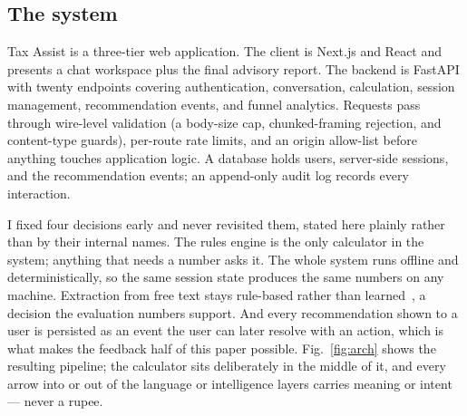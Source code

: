 \documentclass[conference]{IEEEtran}
\begin{document}
\subsection{The system}
Tax Assist is a three-tier web application. The client is Next.js and
React and presents a chat workspace plus the final advisory report.
The backend is FastAPI with twenty endpoints covering
authentication, conversation, calculation, session management,
recommendation events, and funnel analytics. Requests pass through
wire-level validation (a body-size cap, chunked-framing rejection,
and content-type guards), per-route rate limits, and an origin
allow-list before anything touches application logic. A database holds users,
server-side sessions, and the recommendation events; an append-only
audit log records every interaction.

I fixed four decisions early and never revisited them, stated here
plainly rather than by their internal names. The rules engine is the
only calculator in the system; anything that needs a number asks it.
The whole system runs offline and deterministically, so the same
session state produces the same numbers on any machine. Extraction
from free text stays rule-based rather than learned~\cite{chiticariu2013},
a decision the
evaluation numbers support. And every recommendation shown to a user
is persisted as an event the user can later resolve with an action,
which is what makes the feedback half of this paper possible.
Fig.~\ref{fig:arch} shows the resulting pipeline; the calculator sits
deliberately in the middle of it, and every arrow into or out of the
language or intelligence layers carries meaning or intent --- never a
rupee.
\end{document}
